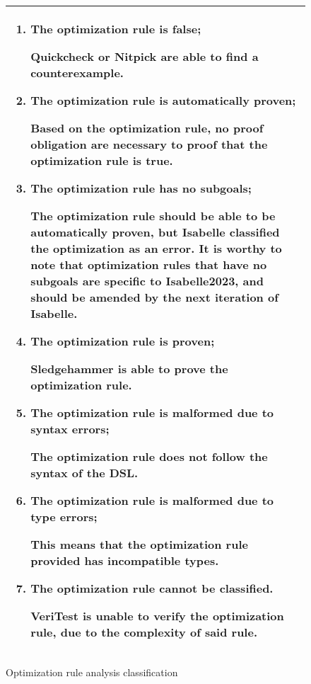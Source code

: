 \begin{figure}[h]
    \begin{tabular}{|L{0.95\textwidth}|}
          \hline
          \begin{enumerate}
                \item The optimization rule is false;
                
                    Quickcheck or Nitpick are able to find a counterexample.
            
                \item The optimization rule is automatically proven;
                
                    Based on the optimization rule, no proof obligation are necessary to proof that the optimization rule is true.  
                
                \item The optimization rule has no subgoals;
                
                    The optimization rule should be able to be automatically proven, but Isabelle classified the optimization as an error.
                    It is worthy to note that optimization rules that have no subgoals are specific to Isabelle2023, and 
                    should be amended by the next iteration of Isabelle.
                
                \item The optimization rule is proven;
                
                    Sledgehammer is able to prove the optimization rule.
                
                \item The optimization rule is malformed due to syntax errors;
                
                    The optimization rule does not follow the syntax of the DSL.

                \item The optimization rule is malformed due to type errors;
                
                    This means that the optimization rule provided has incompatible types.
            
                \item The optimization rule cannot be classified.
                      
                    VeriTest is unable to verify the optimization rule, due to the complexity of said rule.
          \end{enumerate} \\
          \hline
    \end{tabular}
    \caption{Optimization rule analysis classification}
    \label{fig:analysisClassification}
\end{figure}

